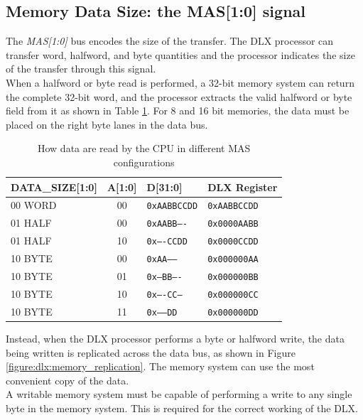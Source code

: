 \subsection{Memory Data Size: the MAS[1:0] signal}

The \emph{MAS[1:0]} bus encodes the size of the transfer. The DLX processor can transfer word, halfword, and byte quantities and the processor indicates the size of the transfer through this signal.\\

When a halfword or byte read is performed, a 32-bit memory system can return the complete 32-bit word, and the processor extracts the valid halfword or byte field from it as shown in Table \ref{table:memory_read_configuration}. For 8 and 16 bit memories, the data must be placed on the right byte lanes in the data bus.


\begin{table}[H]
    \centering
    \begin{tabular}{|l|c|l|l|}
    \hline
        DATA\_SIZE[1:0] & A[1:0] & D[31:0] & DLX Register \\ \hline
        00 WORD & 00 & \texttt{0xAABBCCDD} & \texttt{0xAABBCCDD} \\ \hline
        01 HALF & 00 & \texttt{0xAABB----} & \texttt{0x0000AABB} \\ \hline
        01 HALF & 10 & \texttt{0x----CCDD} & \texttt{0x0000CCDD} \\ \hline
        10 BYTE & 00 & \texttt{0xAA------} & \texttt{0x000000AA} \\ \hline
        10 BYTE & 01 & \texttt{0x--BB----} & \texttt{0x000000BB} \\ \hline
        10 BYTE & 10 & \texttt{0x----CC--} & \texttt{0x000000CC} \\ \hline
        10 BYTE & 11 & \texttt{0x------DD} & \texttt{0x000000DD} \\ \hline
    \end{tabular}
    \caption{How data are read by the CPU in different MAS configurations}
    \label{table:memory_read_configuration}
\end{table}

Instead, when the DLX processor performs a byte or halfword write, the data being written is replicated across the data bus, as shown in Figure \ref{figure:dlx:memory_replication}. The memory system can use the most convenient copy of the data.\\

A writable memory system must be capable of performing a write to any single byte in the memory system. This is required for the correct working of the DLX. 


